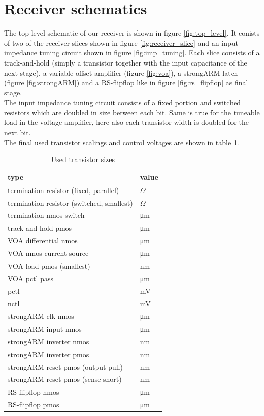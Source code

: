 \section{Receiver schematics}
\label{sec:rx_schematics}

The top-level schematic of our receiver is shown in figure \ref{fig:top_level}. It conists of two of the receiver slices shown in figure \ref{fig:receiver_slice} and an input impedance tuning circuit shown in figure \ref{fig:imp_tuning}. Each slice consists of a track-and-hold (simply a transistor together with the input capacitance of the next stage), a variable offset amplifier (figure \ref{fig:voa}), a strongARM latch (figure \ref{fig:strongARM}) and a RS-flipflop like in figure \ref{fig:rs_flipflop} as final stage.\\
The input impedance tuning circuit consists of a fixed portion and switched resistors which are doubled in size between each bit. Same is true for the tuneable load in the voltage amplifier, here also each transistor width is doubled for the next bit.\\
The final used transistor scalings and control voltages are shown in table \ref{tab:scaling}.

\begin{table}[H]
  \centering
  \begin{tabular}{l|l}
    type & value\\
    \hline
    termination resistor (fixed, parallel) & \unit[131]{$\Omega$}\\
    termination resistor (switched, smallest) & \unit[220]{$\Omega$}\\
    termination nmos switch & \unit[20]{\um}\\
    \hline
    track-and-hold pmos & \unit[20]{\um}\\
    \hline
    VOA differential nmos & \unit[2]{\um}\\
    VOA nmos current source & \unit[16]{\um}\\
    VOA load pmos (smallest) & \unit[400]{nm}\\
    VOA pctl pass & \unit[10]{\um}\\
    pctl & \unit[757]{mV}\\
    nctl & \unit[320]{mV}\\
    \hline
    strongARM clk nmos & \unit[2]{\um}\\
    strongARM input nmos & \unit[2]{\um}\\
    strongARM inverter nmos & \unit[300]{nm}\\
    strongARM inverter pmos & \unit[600]{nm}\\
    strongARM reset pmos (output pull) & \unit[750]{nm}\\
    strongARM reset pmos (sense short) & \unit[200]{nm}\\
    \hline
    RS-flipflop nmos & \unit[2]{\um}\\
    RS-flipflop pmos & \unit[2]{\um}\\
  \end{tabular}
  \caption{Used transistor sizes}
  \label{tab:scaling}
\end{table}

